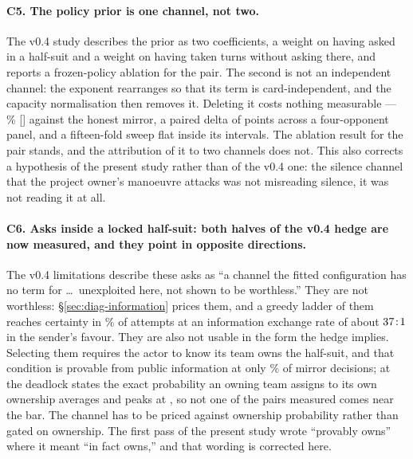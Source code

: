 \paragraph{C5. The policy prior is one channel, not two.} The v0.4 study
describes the prior as two coefficients, a weight on having asked in a half-suit
and a weight on having taken turns without asking there, and reports a
frozen-policy ablation for the pair. The second is not an independent channel:
the exponent rearranges so that its term is card-independent, and the capacity
normalisation then removes it. Deleting it costs nothing measurable ---
\numPhiWin\% [\numPhiCI] against the honest mirror, a paired delta of
\numPhiPaired{} points across a four-opponent panel, and a fifteen-fold sweep flat
inside its intervals. The ablation result for the pair stands, and the
attribution of it to two channels does not. This also corrects a hypothesis of
the present study rather than of the v0.4 one: the silence channel that the
project owner's manoeuvre attacks was not misreading silence, it was not reading
it at all.

\paragraph{C6. Asks inside a locked half-suit: both halves of the v0.4 hedge are
now measured, and they point in opposite directions.} The v0.4 limitations
describe these asks as ``a channel the fitted configuration has no term for
\dots\ unexploited here, not shown to be worthless.'' They are not worthless:
\S\ref{sec:diag-information} prices them, and a greedy ladder of them reaches
certainty in \numLadderRate\% of attempts at an information exchange rate of
about $37\!:\!1$ in the sender's favour. They are also not usable in
the form the hedge implies. Selecting them requires the actor to know its team
owns the half-suit, and that condition is provable from public information at
only \numProvableOwn\% of mirror decisions; at the deadlock states the exact
probability an owning team assigns to its own ownership averages
\numOwnProbMean{} and peaks at \numOwnProbMax{}, so not one of the
\numOwnProbPairs{} pairs measured comes near the \numProvableThresh{} bar. The channel has to be priced against ownership probability rather
than gated on ownership. The first pass of the present study wrote ``provably
owns'' where it meant ``in fact owns,'' and that wording is corrected here.

